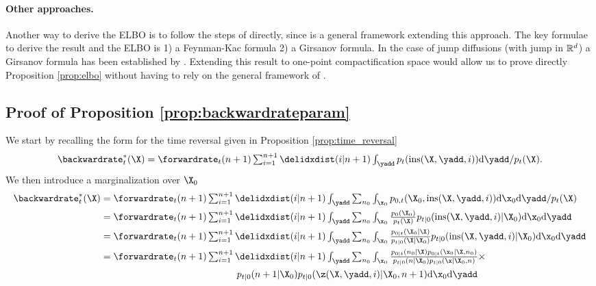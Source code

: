 \paragraph{Other approaches.} Another way to derive the ELBO is to follow
the steps of \cite{huang2021variational} directly, since
\cite{benton2022denoising} is a general framework extending this approach. The
key formulae to derive the result and the ELBO is 1) a Feynman-Kac formula 2) a
Girsanov formula.  In the case of jump diffusions (with jump in $\mathbb{R}^d$) a
Girsanov formula has been established by
\cite{cheridito2005equivalent}. Extending this result to one-point
compactification space would allow us to prove directly Proposition
\ref{prop:elbo} without having to rely on the general framework of
\cite{benton2022denoising}.

\subsection{Proof of Proposition \ref{prop:backwardrateparam}}
\label{sec:tddm-proofPropBackwardRateParam}
We start by recalling the form for the time reversal given in Proposition \ref{prop:time_reversal}
\begin{equation}
\textstyle    \backwardrate_{t}^*(\X) = \forwardrate_{t}(n+1) \sum_{i=1}^{n+1} \delidxdist(i | n+1) \int_{\yadd} p_{t}( \textup{ins}(\X, \yadd, i)) \rmd \yadd  / p_{t}(\X) .
\end{equation}
We then introduce a marginalization over $\X_0$
\begin{align}
    \backwardrate_{t}^*(\X) &\textstyle = \forwardrate_{t}(n+1)  \sum_{i=1}^{n+1} \delidxdist(i | n+1) \int_{\yadd} \sum_{n_0} \int_{\x_0} p_{0,t}(\X_0, \textup{ins}(\X, \yadd, i)) \rmd \x_0 \rmd \yadd  /p_{t}(\X)\\
    &\textstyle = \forwardrate_{t}(n+1) \sum_{i=1}^{n+1} \delidxdist(i | n+1) \int_{\yadd} \sum_{n_0} \int_{\x_0} \frac{p_0(\X_0)}{p_t(\X)} p_{t|0}(\textup{ins}(\X, \yadd, i) | \X_0) \rmd \x_0 \rmd \yadd\\
    &\textstyle = \forwardrate_{t}(n+1) \sum_{i=1}^{n+1} \delidxdist(i | n+1) \int_{\yadd} \sum_{n_0} \int_{\x_0} \frac{p_{0|t}(\X_0 | \X)}{p_{t|0}(\X | \X_0)} p_{t|0}(\textup{ins}(\X, \yadd, i) | \X_0) \rmd \x_0 \rmd \yadd\\
    &\textstyle = \forwardrate_{t}(n+1) \sum_{i=1}^{n+1} \delidxdist(i | n+1) \int_{\yadd} \sum_{n_0} \int_{\x_0} \frac{p_{0|t}(n_0 | \X) p_{0|t}(\x_0 | \X, n_0)}{p_{t|0}(n | \X_0) p_{t|0}(\x | \X_0, n)} \times \\
    &\textstyle  \hspace{5cm} p_{t|0}(n+1 | \X_0) p_{t|0}( \z(\X, \yadd, i) | \X_0, n+1) \rmd \x_0 \rmd \yadd
\end{align}
